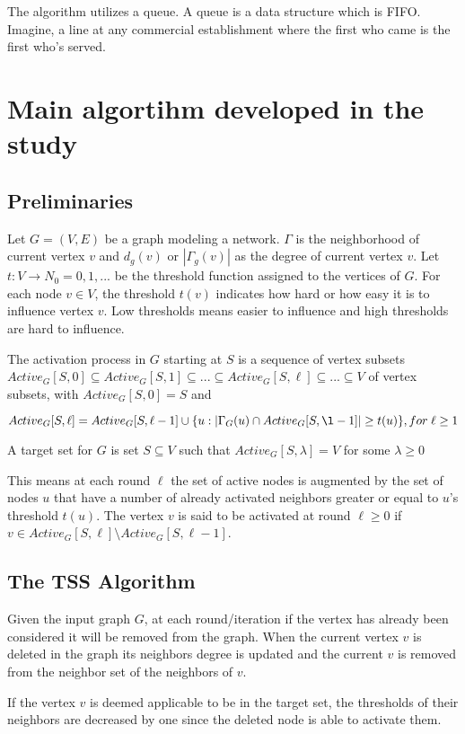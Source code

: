 The algorithm utilizes a queue. A queue is a data structure which is FIFO. Imagine, a line at any commercial establishment where the first who came is the first who's served. 
\section{Main algortihm developed in the study}
\subsection{Preliminaries}
	Let $G = (V,E)$ be a graph modeling a network. $\Gamma$ is the neighborhood of current vertex $v$ and $d_{g}(v)$ or $|\Gamma_{g}(v)|$ as the degree of current vertex $v$.
	Let $t: V \rightarrow N_{0}={0,1,...}$ be the threshold function assigned to the vertices of $G$. For each node $v \in V$, the threshold $t(v)$ indicates how hard or how easy it is to influence vertex $v$. Low thresholds means easier to influence and high thresholds are hard to influence.
	
	The activation process in $G$ starting at $S$ is a sequence of vertex subsets $Active_{G}[S,0] \subseteq Active_{G}[S,1] \subseteq ... \subseteq Active_{G}[S,\ell] \subseteq ... \subseteq V$ of vertex subsets, with $Active_{G}[S,0]=S$ and 
	
	$Active_{G}[S,\ell]=Active_{G}[S,\ell-1] \cup \{u:|\Gamma_{G}(u)\cap Active_{G}[S,\l-1]|\geq t(u)\}, for \; \ell \geq 1$
	
	A target set for $G$ is set $S \subseteq V$ such that $Active_{G}[S,\lambda]=V$ for some $\lambda \geq 0$
	
	This means at each round $\ell$ the set of active nodes is augmented by the set of nodes $u$ that have a number of already activated neighbors greater or equal to $u$'s threshold $t(u)$. The vertex $v$ is said to be activated at round $\ell \ge 0$ if $v \in Active_{G}[S,\ell]\setminus Active_{G}[S,\ell-1]$.
	
	\subsection{The TSS Algorithm}
	
	Given the input graph $G$, at each round/iteration if the vertex has already been considered it will be removed from the graph. When the current vertex $v$ is deleted in the graph its neighbors degree is updated and the current $v$ is removed from the neighbor set of the neighbors of $v$.
	
	If the vertex $v$ is deemed applicable to be in the target set, the thresholds of their neighbors are decreased by one since the deleted node is able to activate them.
	

